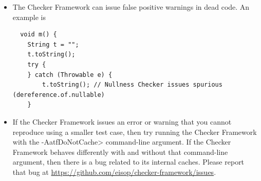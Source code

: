 \begin{itemize}
\begin{smaller}
\begin{Verbatim}
public String(char value[], @IndexFor("value") int offset, @IndexOrHigh("value") int count) { ... }
\end{Verbatim}
\end{smaller}

\noindent
you will get an error such as

\begin{smaller}
\begin{Verbatim}[]
[expression.unparsable] Expression in dependent type annotation invalid:
Use "#1" rather than "value"
\end{Verbatim}
\end{smaller}

Section~\ref{java-expressions-as-arguments} explains that you need to use
a different syntax to refer to a formal parameter:

\begin{smaller}
\begin{Verbatim}
public String(char value[], @IndexFor("#1") int offset, @IndexOrHigh("#1") int count) { ... }
\end{Verbatim}
\end{smaller}


\item
\label{false-positive-in-dead-code}
  The Checker Framework can issue false positive warnings in dead code.  An
  example is

\begin{smaller}
\begin{Verbatim}
  void m() {
    String t = "";
    t.toString();
    try {
    } catch (Throwable e) {
        t.toString(); // Nullness Checker issues spurious (dereference.of.nullable)
    }
\end{Verbatim}
\end{smaller}

\item
  If the Checker Framework issues an error or warning that you cannot
  reproduce using a smaller test case, then try running the Checker
  Framework with the \<-AatfDoNotCache> command-line argument.  If the
  Checker Framework behaves differently with and without that command-line
  argument, then there is a bug related to its internal caches.  Please
  report that bug at
  \url{https://github.com/eisop/checker-framework/issues}.

\end{itemize}


